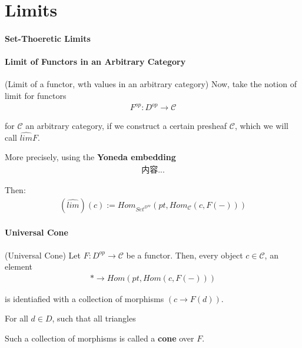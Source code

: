 \documentclass[Total.tex]{subfiles}
\begin{document}
	\chapter{Limits}
		\subsubsection{Set-Thoeretic Limits}
		\subsubsection{Limit of Functors in an Arbitrary Category}
		
		\begin{Def}
			(Limit of a functor, wth values in an arbitrary category) Now,  take the notion of limit for functors
			\begin{gather*}
				F^{op}:D^{op}\rightarrow \mathcal{C}
			\end{gather*}
			
			for $\mathcal{C}$ an arbitrary category, if we construct a certain presheaf $\mathcal{C}$, which we will call $\hat{lim}F$.
			
			More precisely, using the \textbf{Yoneda embedding}
			\begin{gather*}
				内容...
			\end{gather*}
			
			Then:
			\begin{gather*}
				(\hat{lim})(c):=Hom_{Set^{D^{op}}}(pt,Hom_\mathcal{C}(c,F(-)))
			\end{gather*}
		\end{Def}
		
		\subsubsection{Universal Cone}
		\begin{Def}
			(Universal Cone) Let $F:D^{op}\rightarrow \mathcal{C}$ be a functor. Then, every object $c\in \mathcal{C}$, an element
			\begin{gather*}
				*\rightarrow Hom(pt,Hom(c,F(-)))
			\end{gather*}
			
			is identiafied with a collection of morphisms $(c\rightarrow F(d))$.
			
			For all $d\in D$, such that all triangles
			\begin{center}
			\end{center}
			
			Such a collection of morphisms is called a \textbf{cone} over $F$.
		\end{Def}
\end{document}
